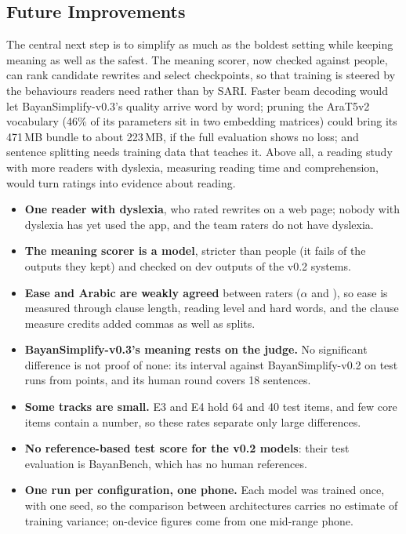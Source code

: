 \documentclass[10pt,a4paper]{article}
\newcommand{\vTwo}{BayanSimplify-v0.2}
\newcommand{\vThree}{BayanSimplify-v0.3}
\begin{document}
\subsection{Future Improvements}
\label{sec:future}

The central next step is to simplify as much as the boldest setting while keeping
meaning as well as the safest. The meaning scorer, now checked against people, can
rank candidate rewrites and select checkpoints, so that training is steered by the
behaviours readers need rather than by SARI. Faster beam decoding would let
\vThree{}'s quality arrive word by word; pruning the AraT5v2 vocabulary (46\% of its
parameters sit in two embedding matrices) could bring its 471\,MB bundle to about
223\,MB, if the full evaluation shows no loss; and
sentence splitting needs training data that teaches it. Above all, a reading study
with more readers with dyslexia, measuring reading time and comprehension, would
turn ratings into evidence about reading.

\begin{itemize}
\item \textbf{One reader with dyslexia}, who rated rewrites on a web page; nobody
      with dyslexia has yet used the app, and the team raters do not have dyslexia.
\item \textbf{The meaning scorer is a model}, stricter than people (it fails
      \hWrongFail{} of the \hKept{} outputs they kept) and checked on dev outputs of
      the v0.2 systems.
\item \textbf{Ease and Arabic are weakly agreed} between raters ($\alpha$
      \hAlphaEase{} and \hAlphaArabic{}), so ease is measured through clause
      length, reading level and hard words, and the clause measure credits added
      commas as well as splits.
\item \textbf{\vThree{}'s meaning rests on the judge.} No significant difference is
      not proof of none: its interval against \vTwo{} on test runs from
      \mBeamTKeptCi{} points, and its human round covers 18 sentences.
\item \textbf{Some tracks are small.} E3 and E4 hold 64 and 40 test items, and few
      core items contain a number, so these rates separate only large differences.
\item \textbf{No reference-based test score for the v0.2 models}: their test
      evaluation is BayanBench, which has no human references.
\item \textbf{One run per configuration, one phone.} Each model was trained once,
      with one seed, so the comparison between architectures carries no estimate of
      training variance; on-device figures come from one mid-range phone.
\end{itemize}
\end{document}
